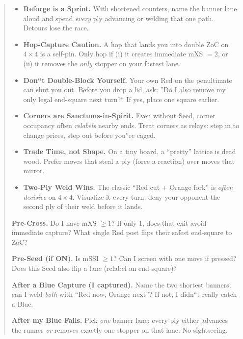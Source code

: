 \documentclass[11pt]{article}
\begin{document}
\begin{quote}
\begin{itemize}[leftmargin=1.3em,itemsep=0.35em]
  \item \textbf{Reforge is a Sprint.} With shortened counters, name the banner lane aloud and spend \emph{every} ply advancing or welding that one path. Detours lose the race.

  \item \textbf{Hop-Capture Caution.} A hop that lands you into double ZoC on $4\times4$ is a self-pin. Only hop if (i) it creates immediate mXS $=2$, or (ii) it removes the \emph{only} stopper on your fastest lane.

  \item \textbf{Don``t Double-Block Yourself.} Your own Red on the penultimate can shut you out. Before you drop a lid, ask: ''Do I also remove my only legal end-square next turn?`` If yes, place one square earlier.

  \item \textbf{Corners are Sanctums-in-Spirit.} Even without Seed, corner occupancy often \emph{relabels} nearby ends. Treat corners as relays: step in to change prices, step out before you''re caged.

  \item \textbf{Trade Time, not Shape.} On a tiny board, a ``pretty'' lattice is dead wood. Prefer moves that steal a ply (force a reaction) over moves that mirror.

  \item \textbf{Two-Ply Weld Wins.} The classic ``Red cut + Orange fork'' is \emph{often decisive} on $4\times4$. Visualize it every turn; deny your opponent the second ply of their weld before it lands.
\end{itemize}

\medskip
\begin{tcolorbox}[enhanced,breakable,title={Pocket Checklists (Say it before you move)},
  colback=white,colframe=royal,boxrule=0.8pt]
\small
\textbf{Pre-Cross.} Do I have mXS $\ge 1$? If only 1, does that exit avoid immediate capture? What single Red post flips their safest end-square to ZoC?

\textbf{Pre-Seed (if ON).} Is mSSI $\ge 1$? Can I screen with one move if pressed? Does this Seed also flip a lane (relabel an end-square)?

\textbf{After a Blue Capture (I captured).} Name the two shortest banners; can I weld \emph{both} with ``Red now, Orange next''? If not, I didn``t really catch a Blue.

\textbf{After my Blue Falls.} Pick \emph{one} banner lane; every ply either advances the runner \emph{or} removes exactly one stopper on that lane. No sightseeing.


\end{tcolorbox}
\end{quote}
\end{document}
